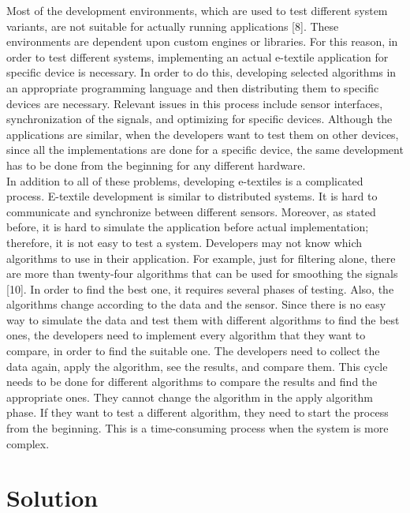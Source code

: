 	Most of the development environments, which are used to test different system variants, are not suitable for actually running applications [8]. These environments are dependent upon custom engines or libraries. For this reason, in order to test different systems, implementing an actual e-textile application for specific device is necessary. In order to do this, developing selected algorithms in an appropriate programming language and then distributing them to specific devices are necessary. Relevant issues in this process include sensor interfaces, synchronization of the signals, and optimizing for specific devices. Although the applications are similar, when the developers want to test them on other devices, since all the implementations are done for a specific device, the same development has to be done from the beginning for any different hardware.  \\
	

	In addition to all of these problems, developing e-textiles is a complicated process. E-textile development is similar to distributed systems. It is hard to communicate and synchronize between different sensors. Moreover, as stated before, it is hard to simulate the application before actual implementation; therefore, it is not easy to test a system. Developers may not know which algorithms to use in their application. For example, just for filtering alone, there are more than twenty-four algorithms that can be used for smoothing the signals [10]. In order to find the best one, it requires several phases of testing. Also, the algorithms change according to the data and the sensor. Since there is no easy way to simulate the data and test them with different algorithms to find the best ones, the developers need to implement every algorithm that they want to compare, in order to find the suitable one. The developers need to collect the data again, apply the algorithm, see the results, and compare them. This cycle needs to be done for different algorithms to compare the results and find the appropriate ones. They cannot change the algorithm in the apply algorithm phase. If they want to test a different algorithm, they need to start the process from the beginning. This is a time-consuming process when the system is more complex. 





\section{Solution}

